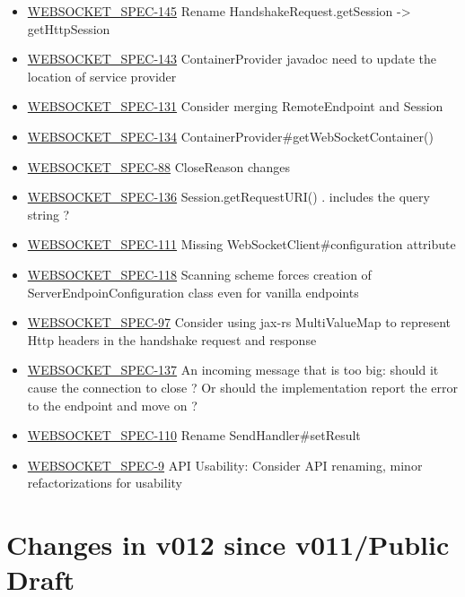 \begin{itemize}
\item \href {http://java.net/jira/browse/WEBSOCKET_SPEC-145}{WEBSOCKET\_SPEC-145} Rename HandshakeRequest.getSession -> getHttpSession
\item \href {http://java.net/jira/browse/WEBSOCKET_SPEC-143}{WEBSOCKET\_SPEC-143} ContainerProvider javadoc need to update the location of service provider
\item \href {http://java.net/jira/browse/WEBSOCKET_SPEC-131}{WEBSOCKET\_SPEC-131} Consider merging RemoteEndpoint and Session
\item \href {http://java.net/jira/browse/WEBSOCKET_SPEC-134}{WEBSOCKET\_SPEC-134} ContainerProvider\#getWebSocketContainer()
\item \href {http://java.net/jira/browse/WEBSOCKET_SPEC-88}{WEBSOCKET\_SPEC-88} CloseReason changes
\item \href {http://java.net/jira/browse/WEBSOCKET_SPEC-136}{WEBSOCKET\_SPEC-136} Session.getRequestURI() . includes the query string ?
\item \href {http://java.net/jira/browse/WEBSOCKET_SPEC-111}{WEBSOCKET\_SPEC-111} Missing WebSocketClient\#configuration attribute
\item \href {http://java.net/jira/browse/WEBSOCKET_SPEC-118}{WEBSOCKET\_SPEC-118} Scanning scheme forces creation of ServerEndpoinConfiguration class even for vanilla endpoints
\item \href {http://java.net/jira/browse/WEBSOCKET_SPEC-97}{WEBSOCKET\_SPEC-97} Consider using jax-rs MultiValueMap to represent Http headers in the handshake request and response
\item \href {http://java.net/jira/browse/WEBSOCKET_SPEC-137}{WEBSOCKET\_SPEC-137} An incoming message that is too big: should it cause the connection to close ? Or should the implementation report the error to the endpoint and move on ?
\item \href {http://java.net/jira/browse/WEBSOCKET_SPEC-110}{WEBSOCKET\_SPEC-110} Rename SendHandler\#setResult
\item \href {http://java.net/jira/browse/WEBSOCKET_SPEC-9}{WEBSOCKET\_SPEC-9} API Usability: Consider API renaming, minor refactorizations for usability
\end{itemize}

\section*{Changes in v012 since v011/Public Draft}


